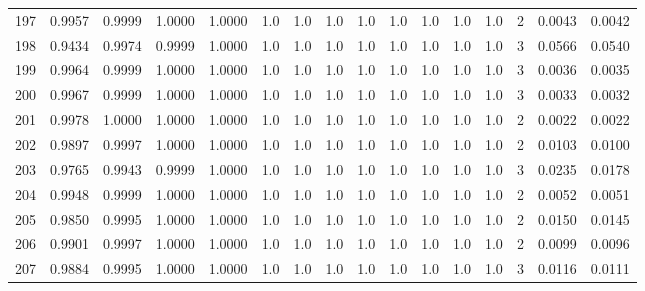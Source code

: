 \begin{tabular}{lrrrrrrrrrrrrrrr}
197 &      0.9957 &  0.9999 &  1.0000 &  1.0000 &     1.0 &     1.0 &     1.0 &     1.0 &     1.0 &     1.0 &      1.0 &        1.0 &      2 &                    0.0043 &                     0.0042 \\
198 &      0.9434 &  0.9974 &  0.9999 &  1.0000 &     1.0 &     1.0 &     1.0 &     1.0 &     1.0 &     1.0 &      1.0 &        1.0 &      3 &                    0.0566 &                     0.0540 \\
199 &      0.9964 &  0.9999 &  1.0000 &  1.0000 &     1.0 &     1.0 &     1.0 &     1.0 &     1.0 &     1.0 &      1.0 &        1.0 &      3 &                    0.0036 &                     0.0035 \\
200 &      0.9967 &  0.9999 &  1.0000 &  1.0000 &     1.0 &     1.0 &     1.0 &     1.0 &     1.0 &     1.0 &      1.0 &        1.0 &      3 &                    0.0033 &                     0.0032 \\
201 &      0.9978 &  1.0000 &  1.0000 &  1.0000 &     1.0 &     1.0 &     1.0 &     1.0 &     1.0 &     1.0 &      1.0 &        1.0 &      2 &                    0.0022 &                     0.0022 \\
202 &      0.9897 &  0.9997 &  1.0000 &  1.0000 &     1.0 &     1.0 &     1.0 &     1.0 &     1.0 &     1.0 &      1.0 &        1.0 &      2 &                    0.0103 &                     0.0100 \\
203 &      0.9765 &  0.9943 &  0.9999 &  1.0000 &     1.0 &     1.0 &     1.0 &     1.0 &     1.0 &     1.0 &      1.0 &        1.0 &      3 &                    0.0235 &                     0.0178 \\
204 &      0.9948 &  0.9999 &  1.0000 &  1.0000 &     1.0 &     1.0 &     1.0 &     1.0 &     1.0 &     1.0 &      1.0 &        1.0 &      2 &                    0.0052 &                     0.0051 \\
205 &      0.9850 &  0.9995 &  1.0000 &  1.0000 &     1.0 &     1.0 &     1.0 &     1.0 &     1.0 &     1.0 &      1.0 &        1.0 &      2 &                    0.0150 &                     0.0145 \\
206 &      0.9901 &  0.9997 &  1.0000 &  1.0000 &     1.0 &     1.0 &     1.0 &     1.0 &     1.0 &     1.0 &      1.0 &        1.0 &      2 &                    0.0099 &                     0.0096 \\
207 &      0.9884 &  0.9995 &  1.0000 &  1.0000 &     1.0 &     1.0 &     1.0 &     1.0 &     1.0 &     1.0 &      1.0 &        1.0 &      3 &                    0.0116 &                     0.0111 \\

\end{tabular}
